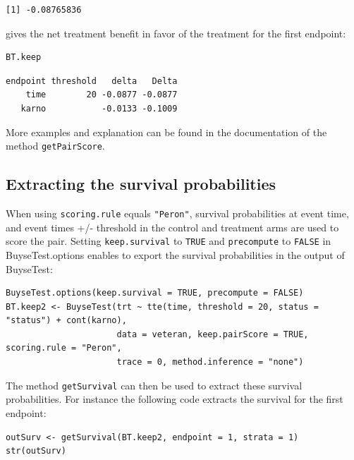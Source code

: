 \documentclass[12pt]{article}
\begin{document}
\begin{verbatim}
[1] -0.08765836
\end{verbatim}


gives the net treatment benefit in favor of the treatment for the first
endpoint:
\lstset{language=r,label= ,caption= ,captionpos=b,numbers=none}
\begin{lstlisting}
BT.keep
\end{lstlisting}

\begin{verbatim}
endpoint threshold   delta   Delta
    time        20 -0.0877 -0.0877
   karno           -0.0133 -0.1009
\end{verbatim}


More examples and explanation can be found in the documentation of
the method \texttt{getPairScore}.

\subsection{Extracting the survival probabilities}
\label{sec:org5a46f99}
When using \texttt{scoring.rule} equals \texttt{"Peron"}, survival probabilities at
event time, and event times +/- threshold in the control and treatment
arms are used to score the pair. Setting \texttt{keep.survival} to \texttt{TRUE} and
\texttt{precompute} to \texttt{FALSE} in BuyseTest.options enables to export the
survival probabilities in the output of BuyseTest:
\lstset{language=r,label= ,caption= ,captionpos=b,numbers=none}
\begin{lstlisting}
BuyseTest.options(keep.survival = TRUE, precompute = FALSE)
BT.keep2 <- BuyseTest(trt ~ tte(time, threshold = 20, status = "status") + cont(karno),
                      data = veteran, keep.pairScore = TRUE, scoring.rule = "Peron",
                      trace = 0, method.inference = "none")
\end{lstlisting}

The method \texttt{getSurvival} can then be used to extract these survival
probabilities. For instance the following code extracts the survival
for the first endpoint:
\lstset{language=r,label= ,caption= ,captionpos=b,numbers=none}
\begin{lstlisting}
outSurv <- getSurvival(BT.keep2, endpoint = 1, strata = 1)
str(outSurv)
\end{lstlisting}
\end{document}
